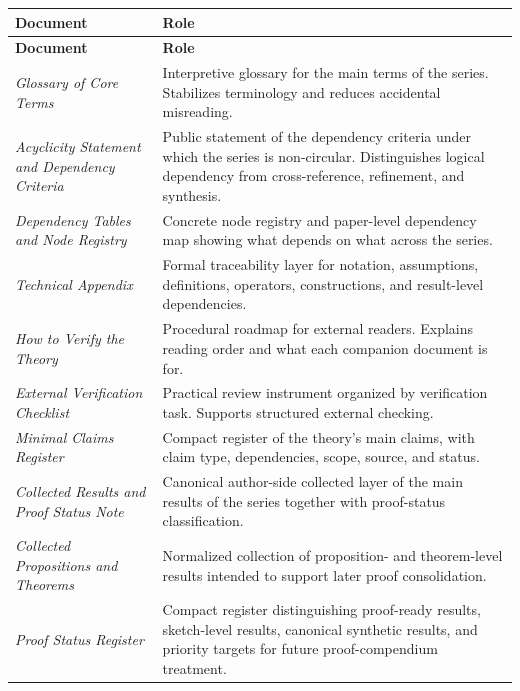 \documentclass[12pt]{article}
\begin{document}
	\begin{longtable}{>{\RaggedRight\arraybackslash}p{}
			>{\RaggedRight\arraybackslash}p{}}
		\toprule
		\textbf{Document} & \textbf{Role} \\
		\midrule
		\endfirsthead
		\toprule
		\textbf{Document} & \textbf{Role} \\
		\midrule
		\endhead
		
		\emph{Glossary of Core Terms} & Interpretive glossary for the main terms of the series. Stabilizes terminology and reduces accidental misreading. \\
		
		\emph{Acyclicity Statement and Dependency Criteria} & Public statement of the dependency criteria under which the series is non-circular. Distinguishes logical dependency from cross-reference, refinement, and synthesis. \\
		
		\emph{Dependency Tables and Node Registry} & Concrete node registry and paper-level dependency map showing what depends on what across the series. \\
		
		\emph{Technical Appendix} & Formal traceability layer for notation, assumptions, definitions, operators, constructions, and result-level dependencies. \\
		
		\emph{How to Verify the Theory} & Procedural roadmap for external readers. Explains reading order and what each companion document is for. \\
		
		\emph{External Verification Checklist} & Practical review instrument organized by verification task. Supports structured external checking. \\
		
		\emph{Minimal Claims Register} & Compact register of the theory's main claims, with claim type, dependencies, scope, source, and status. \\
		
		\emph{Collected Results and Proof Status Note} & Canonical author-side collected layer of the main results of the series together with proof-status classification. \\
		
		\emph{Collected Propositions and Theorems} & Normalized collection of proposition- and theorem-level results intended to support later proof consolidation. \\
		
		\emph{Proof Status Register} & Compact register distinguishing proof-ready results, sketch-level results, canonical synthetic results, and priority targets for future proof-compendium treatment. \\
		
		\bottomrule
	\end{longtable}
	
\end{document}
